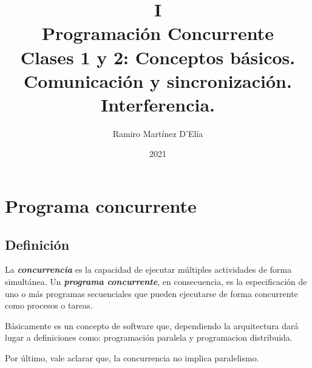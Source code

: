 \documentclass[a4paper, 10pt]{report}
\begin{document}
\title{
    I\\
    Programación Concurrente\\
    \large Clases 1 y 2: Conceptos básicos. Comunicación y sincronización. Interferencia.
}

\author{Ramiro Martínez D'Elía}
\date{2021}
\maketitle

\tableofcontents

\chapter{Programa concurrente}

\section{Definición}

La \textbf{\emph{concurrencia}} es la capacidad de ejecutar múltiples actividades de forma simultánea. Un \textbf{\emph{programa concurrente}}, en consecuencia, es la especificación de uno o más programas secuenciales que pueden ejecutarse de forma concurrente como procesos o tareas. 

Básicamente es un concepto de software que, dependiendo la arquitectura dará lugar a definiciones como: programación paralela y programacion distribuida. 

Por último, vale aclarar que, la concurrencia no implica paralelismo.
\end{document}
